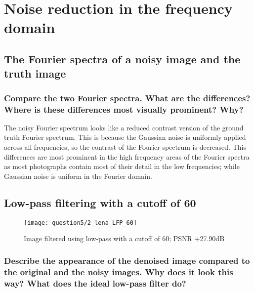 \section{Noise reduction in the frequency domain}

\subsection{The Fourier spectra of a noisy image and the truth image}

\begin{figure}[ht]
\centering
\end{figure}

\subsubsection{Compare the two Fourier spectra. What are the differences? Where is these differences most visually
prominent? Why?}

The noisy Fourier spectrum looks like a reduced contrast version of the ground truth Fourier spectrum. This is because the Gaussian noise is uniformly applied across all frequencies, so the contrast of the Fourier spectrum is decreased. This differences are most prominent in the high frequency areas of the Fourier spectra as most photographs contain most of their detail in the low frequencies; while Gaussian noise is uniform in the Fourier domain.


\subsection{Low-pass filtering with a cutoff of 60}
\begin{figure}[ht]
\centering
	\texttt{[image: question5/2\_lena\_LFP\_60]}
	\caption{Image filtered using low-pass with a cutoff of 60; PSNR +27.90dB}
\end{figure}

\subsubsection{Describe the appearance of the denoised image compared to the original and the noisy images. Why does it look this way? What does the ideal low-pass filter do?}

